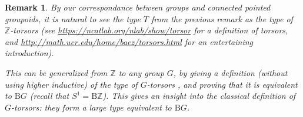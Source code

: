 \documentclass{article}[6pt]%
\newtheorem{remark}{Remark}
\begin{document}
\begin{remark}
By our correspondance between groups and connected pointed groupoids, it is natural to see the type $T$ from the previous remark as the type of $\mathbb{Z}$-torsors (see \url{https://ncatlab.org/nlab/show/torsor} for a definition of torsors, and \url{http://math.ucr.edu/home/baez/torsors.html} for an entertaining introduction). %

This can be generalized from $\mathbb{Z}$ to any group $G$, by giving a definition (without using higher inductive) of the type of $G$-torsors , and proving that it is equivalent to $\mathrm{B}G$ (recall that $S^1 = \mathrm{B}\mathbb{Z}$). This gives an insight into the classical definition of $G$-torsors: they form a large type equivalent to $\mathrm{B} G$.
\end{remark}
\end{document}
